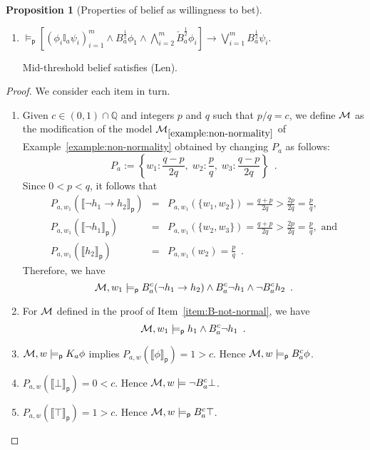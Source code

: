 \documentclass[12pt]{article}
\theoremstyle{definition}
\newtheorem{proposition}[theorem]{Proposition}
\newcommand{\Rat}{\mathbb{Q}}  %
\newcommand{\M}{{\cal M}}      %
\newcommand{\modelsp}{\models_{\mathsf{p}}}                  %
\newcommand{\semp}[1]{\llbracket{#1}\rrbracket_{\mathsf{p}}} %
\begin{document}
\begin{proposition}[Properties of belief as willingness to bet]
\begin{enumerate}
    For mid-threshold belief, if $\phi$ is consistent
    with agent $a$'s beliefs and $\lnot\phi\land\psi$ is
    consistent with agent $a$'s knowledge, then agent $a$ believes
    $\phi\lor\psi$.  

  \item \label{item:B-Len}
    $
    \textstyle \modelsp
    [(\phi_i\mathbb{I}_a\psi_i)_{i=1}^m \land
    B_a^{\frac 12}\phi_1 \land \bigwedge_{i=2}^m \check B_a^{\frac 12}\phi_i] \to
    \bigvee_{i=1}^m B_a^{\frac 12}\psi_i
    $.

    Mid-threshold belief satisfies (Len).
  \end{enumerate}
\end{proposition}
\begin{proof}
  We consider each item in turn.
  \begin{enumerate}
  \item Given $c\in(0,1)\cap\Rat$ and integers $p$ and $q$ such that
    $p/q=c$, we define $\M$ as the modification of the model
    $\M_{\ref{example:non-normality}}$ of
    Example~\ref{example:non-normality} obtained by changing
    $P_a$ as follows:
    \[
    P_a := \left\{ w_1:\frac{q-p}{2q},\; w_2:\frac pq,\; w_3:\frac{q-p}{2q}
    \right\}\enspace.
    \]
    Since $0<p<q$, it follows that
    \begin{eqnarray*}
      P_{a,w_1}(\semp{\lnot h_1\to h_2}) &=&
      P_{a,w_1}(\{w_1,w_2\}) =
      \frac{q+p}{2q}>\frac {2p}{2q}=\frac pq,
      \\
      P_{a,w_1}(\semp{\lnot h_1}) &=&
      P_{a,w_1}(\{w_2,w_3\}) = \frac{q+p}{2q}>\frac {2p}{2q}=\frac pq,\text{ and}
      \\
      P_{a,w_1}(\semp{h_2})&=& 
      P_{a,w_1}(w_2) = \frac pq\enspace.
    \end{eqnarray*}
    Therefore, we have
    \[
    \M,w_1\modelsp B^c_a(\lnot h_1\to h_2)\land B^c_a\lnot h_1\land
    \lnot B^c_ah_2\enspace.
    \]
    
  \item For $\M$ defined in the proof of Item~\ref{item:B-not-normal},
    we have
    \[
    \M,w_1\modelsp h_1\land B_a^c\lnot h_1\enspace.
    \]
    
  \item $\M,w\modelsp K_a\phi$ implies $P_{a,w}(\semp{\phi})=1 > c$.
    Hence $\M,w\modelsp B_a^c\phi$.

  \item $P_{a,w}(\semp{\bot})=0<c$.  Hence
    $\M,w\models\lnot B^c_a\bot$.

  \item $P_{a,w}(\semp{\top})=1>c$. Hence
    $\M,w\modelsp B_a^c\top$.


\end{enumerate}
\end{proof}
\end{document}

